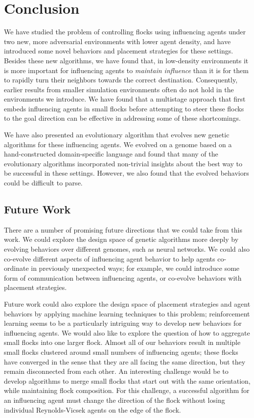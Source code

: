 \chapter{Conclusion}
\label{ch:conclusion}

We have studied the problem of controlling flocks using influencing agents
under two new, more adversarial environments with lower agent density, and
have introduced some novel behaviors and placement strategies for these
settings.
Besides these new algorithms, we have found that, in low-density
environments it is more important for influencing agents to
\textit{maintain influence} than it is for them to rapidly turn their
neighbors towards the correct destination.
Consequently, earlier results from smaller simulation environments often do
not hold in the environments we introduce.
We have found that a multistage approach that first embeds influencing
agents in small flocks before attempting to steer these flocks to the goal
direction can be effective in addressing some of these shortcomings.

We have also presented an evolutionary algorithm that evolves new genetic
algorithms for these influencing agents.
We evolved on a genome based on a hand-constructed domain-specific language
and found that many of the evolutionary algorithms incorporated non-trivial
insights about the best way to be successful in these settings.
However, we also found that the evolved behaviors could be difficult to parse.

\section*{Future Work}
There are a number of promising future directions that we could take from this
work.
We could explore the design space of genetic algorithms more deeply by
evolving behaviors over different genomes, such as neural networks.
We could also co-evolve different aspects of influencing agent behavior to help
agents co-ordinate in previously unexpected ways; for example, we could
introduce some form of communication between influencing agents, or co-evolve
behaviors with placement strategies.

Future work could also explore the design space of placement strategies and
agent behaviors by applying machine learning techniques to this problem;
reinforcement learning seems to be a particularly intriguing way to develop new
behaviors for influencing agents.
We would also like to explore the question of how to aggregate small flocks
into one larger flock.
Almost all of our behaviors result in multiple small flocks clustered around
small numbers of influencing agents; these flocks have converged in the sense
that they are all facing the same direction, but they remain disconnected from
each other.
An interesting challenge would be to develop algorithms to merge small flocks
that start out with the same orientation, while maintaining flock composition.
For this challenge, a successful algorithm for an influencing agent must change
the direction of the flock without losing individual Reynolds-Vicsek agents on
the edge of the flock.

